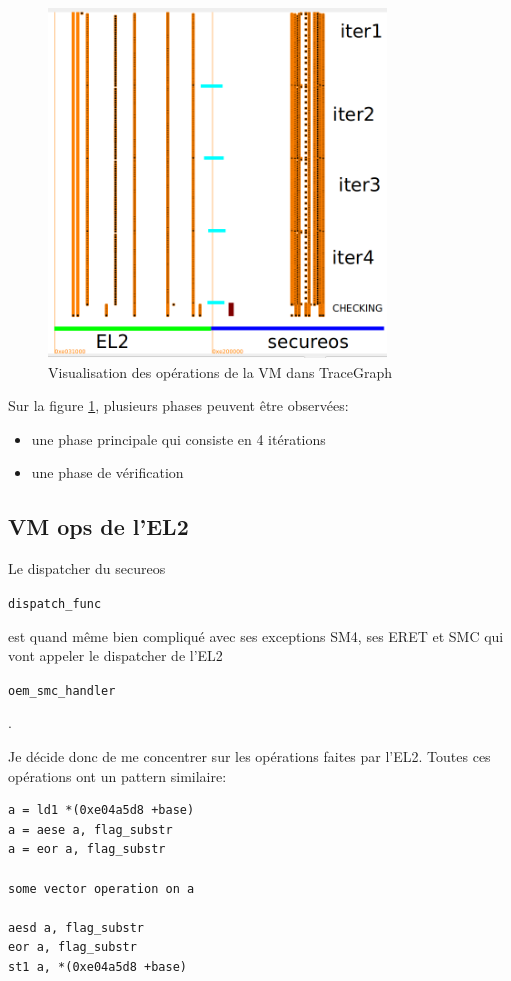 \documentclass[14pt]{article}
\newcommand{\inlinebox}[2]{%
\colorbox{bg}{%
\parbox[b][0.6em]{\widthof{\texttt{#2}}}{\texttt{#2}}
}
}
\newcommand{\inlinec}[1]{ \inlinebox{c}{#1} }
\theoremstyle{definition}
\begin{document}
\begin{figure}[H]
\centering
\includegraphics[width=0.8\textwidth]{./screenshots/p3_vmops_2.png}
  \caption{Visualisation des opérations de la VM dans TraceGraph}
  \label{fig:p3_vmops}
\end{figure}

Sur la figure \ref{fig:p3_vmops}, plusieurs phases peuvent être observées:
\begin{itemize}
    \item une phase principale qui consiste en 4 itérations
    \item une phase de vérification
\end{itemize}




\subsection{VM ops de l'EL2}

Le dispatcher du secureos \inlinec{dispatch_func} est quand même bien compliqué avec ses exceptions SM4, ses ERET et SMC qui vont appeler le dispatcher de l'EL2 \inlinec{oem_smc_handler}.

Je décide donc de me concentrer sur les opérations faites par l'EL2.
Toutes ces opérations ont un pattern similaire:
\begin{verbatim}
a = ld1 *(0xe04a5d8 +base)
a = aese a, flag_substr
a = eor a, flag_substr

some vector operation on a

aesd a, flag_substr
eor a, flag_substr
st1 a, *(0xe04a5d8 +base)
\end{verbatim}
\end{document}
